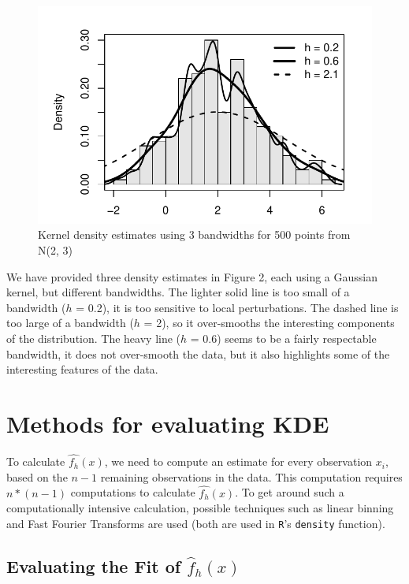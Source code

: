\documentclass[]{article}
\begin{document}
\begin{figure}[htbp]
\centering
\includegraphics{FinalReport_files/figure-latex/unnamed-chunk-3-1.pdf}
\caption{Kernel density estimates using 3 bandwidths for 500 points from
N(2, 3)}
\end{figure}

We have provided three density estimates in Figure 2, each using a
Gaussian kernel, but different bandwidths. The lighter solid line is too
small of a bandwidth (\(h\) = 0.2), it is too sensitive to local
perturbations. The dashed line is too large of a bandwidth (\(h\) = 2),
so it over-smooths the interesting components of the distribution. The
heavy line (\(h\) = 0.6) seems to be a fairly respectable bandwidth, it
does not over-smooth the data, but it also highlights some of the
interesting features of the data.

\newpage

\section{Methods for evaluating KDE}\label{methods-for-evaluating-kde}

To calculate \(\widehat{f_h}(x)\), we need to compute an estimate for
every observation \(x_i\), based on the \(n-1\) remaining observations
in the data. This computation requires \(n * (n-1)\) computations to
calculate \(\widehat{f_h}(x)\). To get around such a computationally
intensive calculation, possible techniques such as linear binning and
Fast Fourier Transforms are used (both are used in \texttt{R}'s
\texttt{density} function).

\subsection{Evaluating the Fit of $\widehat{f}_h(x)$}
\end{document}
